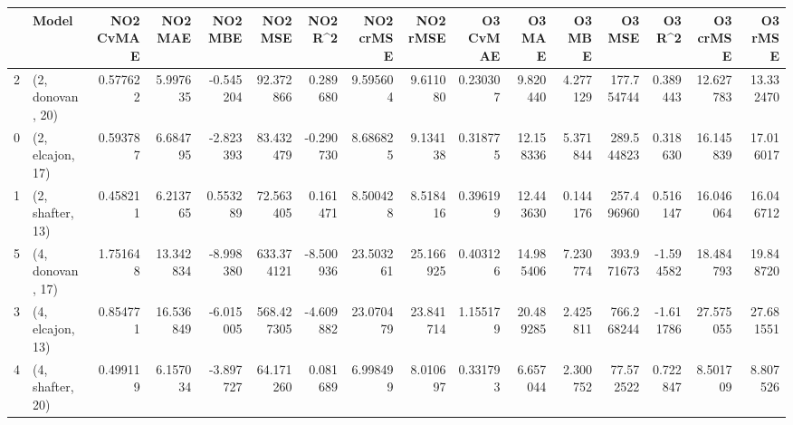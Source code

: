 \begin{tabular}{llrrrrrrrrrrrrrr}
\toprule
{} &             Model &  NO2 CvMAE &    NO2 MAE &   NO2 MBE &     NO2 MSE &   NO2 R\textasciicircum2 &  NO2 crMSE &   NO2 rMSE &  O3 CvMAE &     O3 MAE &    O3 MBE &      O3 MSE &    O3 R\textasciicircum2 &   O3 crMSE &    O3 rMSE \\
\midrule
2 &  (2, donovan, 20) &   0.577622 &   5.997635 & -0.545204 &   92.372866 &  0.289680 &   9.595604 &   9.611080 &  0.230307 &   9.820440 &  4.277129 &  177.754744 &  0.389443 &  12.627783 &  13.332470 \\
0 &  (2, elcajon, 17) &   0.593787 &   6.684795 & -2.823393 &   83.432479 & -0.290730 &   8.686825 &   9.134138 &  0.318775 &  12.158336 &  5.371844 &  289.544823 &  0.318630 &  16.145839 &  17.016017 \\
1 &  (2, shafter, 13) &   0.458211 &   6.213765 &  0.553289 &   72.563405 &  0.161471 &   8.500428 &   8.518416 &  0.396199 &  12.443630 &  0.144176 &  257.496960 &  0.516147 &  16.046064 &  16.046712 \\
5 &  (4, donovan, 17) &   1.751648 &  13.342834 & -8.998380 &  633.374121 & -8.500936 &  23.503261 &  25.166925 &  0.403126 &  14.985406 &  7.230774 &  393.971673 & -1.594582 &  18.484793 &  19.848720 \\
3 &  (4, elcajon, 13) &   0.854771 &  16.536849 & -6.015005 &  568.427305 & -4.609882 &  23.070479 &  23.841714 &  1.155179 &  20.489285 &  2.425811 &  766.268244 & -1.611786 &  27.575055 &  27.681551 \\
4 &  (4, shafter, 20) &   0.499119 &   6.157034 & -3.897727 &   64.171260 &  0.081689 &   6.998499 &   8.010697 &  0.331793 &   6.657044 &  2.300752 &   77.572522 &  0.722847 &   8.501709 &   8.807526 \\
\bottomrule
\end{tabular}
